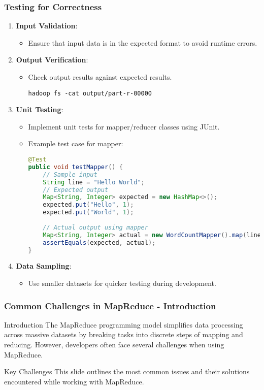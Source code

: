 \documentclass[aspectratio=169]{beamer}
\begin{document}
\begin{frame}[fragile]
    \frametitle{Testing for Correctness}
    \begin{enumerate}
        \item \textbf{Input Validation}:
        \begin{itemize}
            \item Ensure that input data is in the expected format to avoid runtime errors.
        \end{itemize}
        \item \textbf{Output Verification}:
        \begin{itemize}
            \item Check output results against expected results.
            \begin{lstlisting}
hadoop fs -cat output/part-r-00000
            \end{lstlisting}
        \end{itemize}
        \item \textbf{Unit Testing}:
        \begin{itemize}
            \item Implement unit tests for mapper/reducer classes using JUnit.
            \item Example test case for mapper:
            \begin{lstlisting}[language=java]
@Test
public void testMapper() {
    // Sample input
    String line = "Hello World";
    // Expected output
    Map<String, Integer> expected = new HashMap<>();
    expected.put("Hello", 1);
    expected.put("World", 1);
    
    // Actual output using mapper
    Map<String, Integer> actual = new WordCountMapper().map(line);
    assertEquals(expected, actual);
}
            \end{lstlisting}
        \end{itemize}
        \item \textbf{Data Sampling}:
        \begin{itemize}
            \item Use smaller datasets for quicker testing during development.
        \end{itemize}
    \end{enumerate}
\end{frame}

\begin{frame}[fragile]
    \frametitle{Common Challenges in MapReduce - Introduction}
    \begin{block}{Introduction}
        The MapReduce programming model simplifies data processing across massive datasets by breaking tasks into discrete steps of mapping and reducing. However, developers often face several challenges when using MapReduce.
    \end{block}
    
    \begin{block}{Key Challenges}
        This slide outlines the most common issues and their solutions encountered while working with MapReduce.
    \end{block}
\end{frame}
\end{document}
